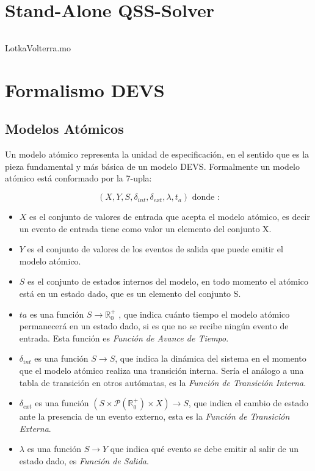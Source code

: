 \documentclass{beamer}
\begin{document}
\section{Stand-Alone QSS-Solver}
\begin{frame}
	\begin{listing}[H]    
		\inputminted[linenos]{modelica}{src/lotka_volterra_qss.mo}
		\caption{LotkaVolterra.mo}\label{lst:LotkaVolterra_qss.mo}
	\end{listing} 
\end{frame}


\section{Formalismo DEVS}
\subsection{Modelos Atómicos}
\begin{frame}
Un modelo atómico representa la unidad  de especificación, en el sentido que es la pieza fundamental y más básica de un modelo DEVS. 
	Formalmente un modelo atómico está conformado por la 7-upla:

	\begin{equation} 
	(X, Y, S, \delta_{int} , \delta_{ext}, \lambda, t_{a}) \mbox{ donde :}
	\end{equation}

	\begin{itemize}
	\item $X$ es el conjunto de valores de entrada que acepta el modelo atómico, es decir un evento de entrada tiene como valor un elemento del conjunto X.
	\item $Y$ es el conjunto de valores de los eventos de salida que puede emitir el modelo atómico.
	\item $S$ es el conjunto de estados internos del modelo, en todo momento el atómico está en un estado dado, que es un elemento del conjunto S.
	\item $ta$ es una función $S \to \mathbb{R}^{+}_{0}$ , que indica cuánto tiempo el modelo atómico permanecerá en un estado dado, si es que no se recibe ningún 
	evento de entrada. Esta función es \emph{Función de Avance de Tiempo}.
	\item $\delta_{int}$ es una función $S \to S$, que indica la dinámica del sistema en el momento que el modelo atómico realiza una transición interna. 
	Sería el análogo a una tabla de transición en otros autómatas, es la \emph{Función de Transición Interna}.
	\item $\delta_{ext}$ es una función $(S \times \mathcal{P}(\mathbb{R}^{+}_{0}) \times X) \to S$, que indica el cambio de estado ante la presencia de un evento 
	externo, esta es la \emph{Función de Transición Externa}.
	\item $\lambda$ es una función $S \to Y$ que indica qué evento se debe emitir al salir de un estado dado, es \emph{Función de Salida}.
	\end{itemize}
\end{frame}
\end{document}
